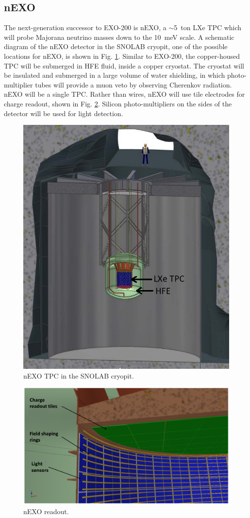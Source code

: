 \subsection{nEXO}

The next-generation successor to EXO-200 is nEXO, a $\sim$5~ton LXe TPC which will probe Majorana neutrino masses down to the 10~meV scale.  A schematic diagram of the nEXO detector in the SNOLAB cryopit, one of the possible locations for nEXO, is shown in Fig. \ref{fig:nEXO_cryopit}.  Similar to EXO-200, the copper-housed TPC will be submerged in HFE fluid, inside a copper cryostat.  The cryostat will be insulated and submerged in a large volume of water shielding, in which photo-multiplier tubes will provide a muon veto by observing Cherenkov radiation.  nEXO will be a single TPC.  Rather than wires, nEXO will use tile electrodes for charge readout, shown in Fig. \ref{fig:nEXO_readout}.  Silicon photo-multipliers on the sides of the detector will be used for light detection.

\begin{figure} %
	\centering
	\includegraphics[width=.7\textwidth]{figures/nEXO_cryopit.png}
	\caption{nEXO TPC in the SNOLAB cryopit.}
\label{fig:nEXO_cryopit}
\end{figure}

\begin{figure} %
	\centering
	\includegraphics[width=.7\textwidth]{figures/nEXO_readout.png}
	\caption{nEXO readout.}
\label{fig:nEXO_readout}
\end{figure}

